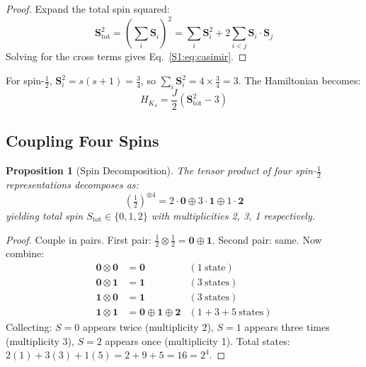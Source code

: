 \documentclass[11pt,a4paper]{article}
\newtheorem{proposition}[theorem]{Proposition}
\theoremstyle{definition}
\begin{document}
\begin{proof}
Expand the total spin squared:
\begin{equation}
\mathbf{S}_{\mathrm{tot}}^2 = \left(\sum_i \mathbf{S}_i\right)^{\!2} = \sum_i \mathbf{S}_i^2 + 2 \sum_{i<j} \mathbf{S}_i \cdot \mathbf{S}_j
\end{equation}
Solving for the cross terms gives Eq.~\eqref{S1:eq:casimir}.
\end{proof}

For spin-$\tfrac{1}{2}$, $\mathbf{S}_i^2 = s(s+1) = \tfrac{3}{4}$, so $\sum_i \mathbf{S}_i^2 = 4 \times \tfrac{3}{4} = 3$. The Hamiltonian becomes:
\begin{equation}
H_{K_4} = \frac{J}{2}\!\left(\mathbf{S}_{\mathrm{tot}}^2 - 3\right)
\label{S1:eq:HK4_total}
\end{equation}

\subsection{Coupling Four Spins}

\begin{proposition}[Spin Decomposition]
\label{S1:prop:spin_decomp}
The tensor product of four spin-$\tfrac{1}{2}$ representations decomposes as:
\begin{equation}
\left(\tfrac{1}{2}\right)^{\otimes 4} = 2 \cdot \mathbf{0} \oplus 3 \cdot \mathbf{1} \oplus 1 \cdot \mathbf{2}
\label{S1:eq:spin_decomp}
\end{equation}
yielding total spin $S_{\mathrm{tot}} \in \{0, 1, 2\}$ with multiplicities 2, 3, 1 respectively.
\end{proposition}

\begin{proof}
Couple in pairs. First pair: $\tfrac{1}{2} \otimes \tfrac{1}{2} = \mathbf{0} \oplus \mathbf{1}$. Second pair: same. Now combine:
\begin{align}
\mathbf{0} \otimes \mathbf{0} &= \mathbf{0} & (1~\text{state}) \nonumber\\
\mathbf{0} \otimes \mathbf{1} &= \mathbf{1} & (3~\text{states}) \nonumber\\
\mathbf{1} \otimes \mathbf{0} &= \mathbf{1} & (3~\text{states}) \nonumber\\
\mathbf{1} \otimes \mathbf{1} &= \mathbf{0} \oplus \mathbf{1} \oplus \mathbf{2} & (1 + 3 + 5~\text{states})
\end{align}
Collecting: $S = 0$ appears twice (multiplicity 2), $S = 1$ appears three times (multiplicity 3), $S = 2$ appears once (multiplicity 1). Total states: $2(1) + 3(3) + 1(5) = 2 + 9 + 5 = 16 = 2^4$.
\end{proof}
\end{document}
